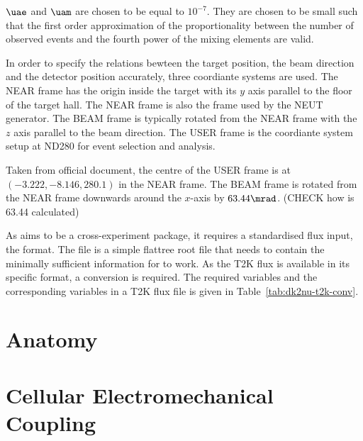     $\uae$ and $\uam$ are chosen to be equal to $10^{-7}$. They are chosen to be small such that the first order approximation of the proportionality between the number of observed events and the fourth power of the mixing elements are valid.

    In order to specify the relations bewteen the target position, the beam direction and the detector position accurately, three coordiante systems are used.
    The NEAR frame has the origin inside the target with its $y$ axis parallel to the floor of the target hall.
    The NEAR frame is also the frame used by the NEUT generator.
    The BEAM frame is typically rotated from the NEAR frame with the $z$ axis parallel to the beam direction. 
    The USER frame is the coordiante system setup at ND280 for event selection and analysis.

    Taken from official document, the centre of the USER frame is at $(-3.222,-8.146,280.1)$ in the NEAR frame. 
    The BEAM frame is rotated from the NEAR frame downwards around the $x$-axis by $63.44\mrad$. 
    (CHECK how is 63.44 calculated)

    As  aims to be a cross-experiment package, it requires a standardised flux input, the  format. 
    The  file is a simple flattree root file that needs to contain the minimally sufficient information for  to work.
    As the T2K flux is available in its specific format, a conversion is required. 
    The required  variables and the corresponding variables in a T2K flux file is given in Table~\ref{tab:dk2nu-t2k-conv}.
        

\section{Anatomy}
\label{sec:anatomy}


\section{Cellular Electromechanical Coupling}
\label{sec:electromech}
